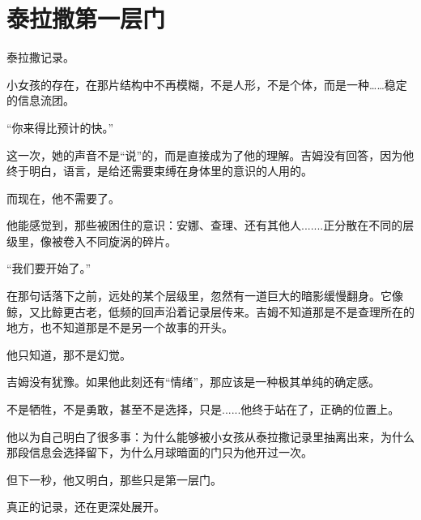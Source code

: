 \chapter{泰拉撒第一层门}

泰拉撒记录。

小女孩的存在，在那片结构中不再模糊，不是人形，不是个体，而是一种……稳定的信息流团。

“你来得比预计的快。”

这一次，她的声音不是“说”的，而是直接成为了他的理解。吉姆没有回答，因为他终于明白，语言，是给还需要束缚在身体里的意识的人用的。

而现在，他不需要了。

他能感觉到，那些被困住的意识：安娜、查理、还有其他人.......正分散在不同的层级里，像被卷入不同旋涡的碎片。

“我们要开始了。”

在那句话落下之前，远处的某个层级里，忽然有一道巨大的暗影缓慢翻身。它像鲸，又比鲸更古老，低频的回声沿着记录层传来。吉姆不知道那是不是查理所在的地方，也不知道那是不是另一个故事的开头。

他只知道，那不是幻觉。

吉姆没有犹豫。如果他此刻还有“情绪”，那应该是一种极其单纯的确定感。

不是牺牲，不是勇敢，甚至不是选择，只是......他终于站在了，正确的位置上。

他以为自己明白了很多事：为什么能够被小女孩从泰拉撒记录里抽离出来，为什么那段信息会选择留下，为什么月球暗面的门只为他开过一次。

但下一秒，他又明白，那些只是第一层门。

真正的记录，还在更深处展开。
